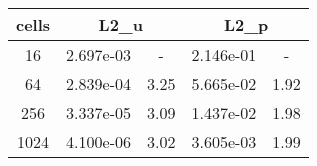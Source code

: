\documentclass[10pt]{report}
\begin{document}
\begin{table}[H]
\begin{center}
\begin{tabular}{|c|c|c|c|c|} \hline
cells & 
\multicolumn{2}{|c|}{L2_u} & 
\multicolumn{2}{|c|}{L2_p}\\ \hline
16 & 2.697e-03 & - & 2.146e-01 & -\\ \hline
64 & 2.839e-04 & 3.25 & 5.665e-02 & 1.92\\ \hline
256 & 3.337e-05 & 3.09 & 1.437e-02 & 1.98\\ \hline
1024 & 4.100e-06 & 3.02 & 3.605e-03 & 1.99\\ \hline
\end{tabular}
\end{center}
\end{table}
\end{document}
